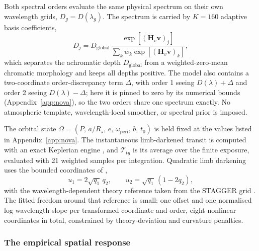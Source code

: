 Both spectral orders evaluate the same physical spectrum on their own
wavelength grids, $D_g=D(\lambda_g)$. The spectrum is carried by $K=160$
adaptive basis coefficients,
\begin{equation}
  D_j = D_{\mathrm{global}}\,
  \frac{\exp\!\left[(\bm{H}_v\bm{v})_j\right]}
       {\sum_k w_k \exp\!\left[(\bm{H}_v\bm{v})_k\right]} ,
  \label{eq:depth-basis}
\end{equation}
which separates the achromatic depth $D_{\mathrm{global}}$ from a
weighted-zero-mean chromatic morphology and keeps all depths positive.
The model also contains a two-coordinate order-discrepancy term $\Delta$,
with order 1 seeing $D(\lambda)+\Delta$ and order 2 seeing
$D(\lambda)-\Delta$; here it is pinned to zero by its numerical bounds
(Appendix~\ref{app:nova}), so the two orders share one spectrum exactly.
No atmospheric template, wavelength-local smoother, or spectral prior is
imposed.

The orbital state
$\Omega=(P,\,a/R_\star,\,e,\,\omega_{\mathrm{peri}},\,b,\,t_0)$ is held
fixed at the values listed in Appendix~\ref{app:nova}. The instantaneous
limb-darkened transit is computed with an exact Keplerian engine
\citep{Jaxoplanet2025}, and $\mathcal{T}_{tg}$ is its average over the
finite exposure, evaluated with 21 weighted samples per integration.
Quadratic limb darkening \citep{MandelAgol2002} uses the bounded
coordinates of \citet{Kipping2013},
\begin{equation}
 u_1=2\sqrt{q_1}\,q_2, \qquad
 u_2=\sqrt{q_1}\,(1-2q_2),
 \label{eq:kipping-coordinates}
\end{equation}
with the wavelength-dependent theory reference taken from the STAGGER
grid \citep{MagicEtAl2015}. The fitted freedom around that reference is
small: one offset and one normalised log-wavelength slope per transformed
coordinate and order, eight nonlinear coordinates in total, constrained
by theory-deviation and curvature penalties.

\subsubsection{The empirical spatial response}



